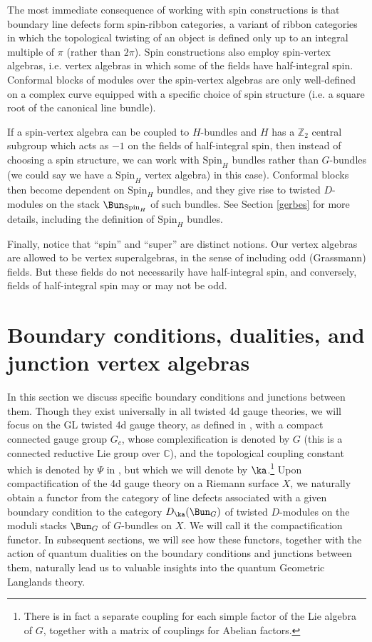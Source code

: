 \documentclass[11pt,reqno]{amsart}
\theoremstyle{plain}
\numberwithin{equation}{section}
\newcommand{\C}{\mathbb{C}}
\newcommand{\Z}{\mathbb{Z}}
\theoremstyle{definition}
\begin{document}
The most immediate consequence of working with spin constructions is
that boundary line defects form spin-ribbon categories, a variant of
ribbon categories in which the topological twisting of an object is
defined only up to an integral multiple of $\pi$ (rather than $2\pi$).
Spin constructions also employ spin-vertex algebras, i.e. vertex
algebras in which some of the fields have half-integral spin.
Conformal blocks of modules over the spin-vertex algebras are only
well-defined on a complex curve equipped with a specific choice of
spin structure (i.e. a square root of the canonical line bundle).

If a spin-vertex algebra can be coupled to $H$-bundles and $H$ has a
$\Z_2$ central subgroup which acts as $-1$ on the fields of
half-integral spin, then instead of choosing a spin structure, we can
work with $\mathrm{Spin}_H$ bundles rather than $G$-bundles (we could
say we have a $\mathrm{Spin}_H$ vertex algebra) in this
case). Conformal blocks then become dependent on $\mathrm{Spin}_H$
bundles, and they give rise to twisted $D$-modules on the stack
$\Bun_{\mathrm{Spin}_H}$ of such bundles. See Section \ref{gerbes} for
more details, including the definition of $\mathrm{Spin}_H$
bundles.

Finally, notice that ``spin'' and ``super'' are distinct notions. Our
vertex algebras are allowed to be vertex superalgebras, in the sense
of including odd (Grassmann) fields. But these fields do not
necessarily have half-integral spin, and conversely, fields of
half-integral spin may or may not be odd.

\section{Boundary conditions, dualities, and junction vertex
  algebras}    \label{bc}

In this section we discuss specific boundary conditions and junctions
between them. Though they exist universally in all twisted 4d gauge
theories, we will focus on the GL twisted 4d gauge theory, as defined
in \cite{KW}, with a compact connected gauge group $G_c$, whose
complexification is denoted by $G$ (this is a connected reductive Lie
group over $\C$), and the topological coupling constant which is
denoted by $\Psi$ in \cite{KW}, but which we will denote by
$\ka$.\footnote{There is in fact a separate coupling for each simple
  factor of the Lie algebra of $G$, together with a matrix of couplings for Abelian factors.} Upon compactification
of the 4d gauge theory on a Riemann surface $X$, we naturally obtain a
functor from the category of line defects associated with a given
boundary condition to the category $D_\ka(\Bun_G)$ of twisted
$D$-modules on the moduli stacks $\Bun_G$ of $G$-bundles on $X$. We
will call it the compactification functor. In subsequent sections, we
will see how these functors, together with the action of quantum
dualities on the boundary conditions and junctions between them,
naturally lead us to valuable insights into the quantum Geometric
Langlands theory.
\end{document}
